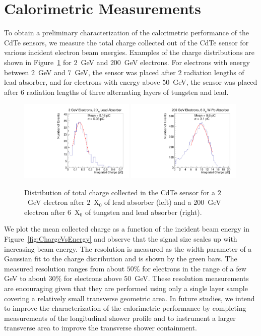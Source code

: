 
\section{Calorimetric Measurements} 
\label{sec:calorimetery} 

To obtain a preliminary characterization of the calorimetric performance 
of the CdTe sensors, we measure the total charge collected out of the CdTe 
sensor for various incident electron beam energies. Examples of the 
charge distributions are shown in Figure~\ref{fig:ChargeDistribution}
for $2$~GeV and $200$~GeV electrons. For electrons with energy between 
$2$~GeV and $7$~GeV, the sensor was placed after $2$ radiation lengths 
of lead absorber, and for electrons with energy above $50$~GeV, the 
sensor was placed after $6$ radiation lengths of three alternating layers of 
tungsten and lead. 

\begin{figure}[htbp] 
\centering
\includegraphics[width=0.49\textwidth]{figures/2GeV_charge.pdf} 
\includegraphics[width=0.49\textwidth]{figures/200GeV_charge.pdf} 
\caption{Distribution of total charge collected in the CdTe sensor for a $2$~GeV
electron after $2$~$\mathrm{X}_{0}$ of lead absorber (left) and a 200~GeV
electron after $6$~$\mathrm{X}_{0}$ of tungsten and lead absorber (right). } 
\label{fig:ChargeDistribution} 
\end{figure} 

We plot the mean collected charge as a function of the incident beam energy
in Figure~\ref{fig:ChargeVsEnergy} and observe that the signal size scales
up with increasing beam energy. The resolution is measured as the width
parameter of a Gaussian fit to the charge distribution and is shown by the green bars. 
The measured resolution ranges from
about $50\%$ for electrons in the range of a few GeV to 
about $30\%$ for electrons above $50$~GeV. 
These resolution measurements are encouraging given that they are performed
using only a single layer sample covering a relatively small transverse
geometric area. In future studies, we intend to improve the characterization
of the calorimetric performance by completing measurements of the
longitudinal shower profile and to instrument a larger transverse 
area to improve the transverse shower containment. 

